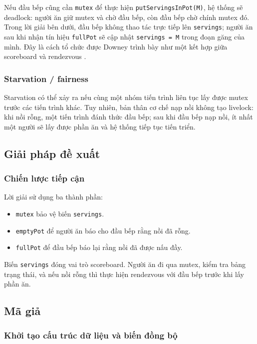 Nếu đầu bếp cũng cần \texttt{mutex} để thực hiện \texttt{putServingsInPot(M)},
hệ thống sẽ deadlock: người ăn giữ mutex và chờ đầu bếp, còn đầu bếp chờ chính
mutex đó. Trong lời giải bên dưới, đầu bếp không thao tác trực tiếp lên
\texttt{servings}; người ăn sau khi nhận tín hiệu \texttt{fullPot} sẽ cập nhật
\texttt{servings = M} trong đoạn găng của mình. Đây là cách tổ chức được Downey
trình bày như một kết hợp giữa scoreboard và rendezvous
\cite[Sec.~5.1]{downey2016}.

\subsubsection*{Starvation / fairness}

Starvation có thể xảy ra nếu cùng một nhóm tiến trình liên tục lấy được mutex
trước các tiến trình khác. Tuy nhiên, bản thân cơ chế nạp nồi không tạo livelock:
khi nồi rỗng, một tiến trình đánh thức đầu bếp; sau khi đầu bếp nạp nồi, ít nhất
một người sẽ lấy được phần ăn và hệ thống tiếp tục tiến triển.

\subsection{Giải pháp đề xuất}

\subsubsection*{Chiến lược tiếp cận}

Lời giải sử dụng ba thành phần:

\begin{itemize}
    \item \texttt{mutex} bảo vệ biến \texttt{servings}.
    \item \texttt{emptyPot} để người ăn báo cho đầu bếp rằng nồi đã rỗng.
    \item \texttt{fullPot} để đầu bếp báo lại rằng nồi đã được nấu đầy.
\end{itemize}

Biến \texttt{servings} đóng vai trò scoreboard. Người ăn đi qua mutex, kiểm tra
bảng trạng thái, và nếu nồi rỗng thì thực hiện rendezvous với đầu bếp trước khi
lấy phần ăn.

\subsection{Mã giả}

\subsubsection*{Khởi tạo cấu trúc dữ liệu và biến đồng bộ}

